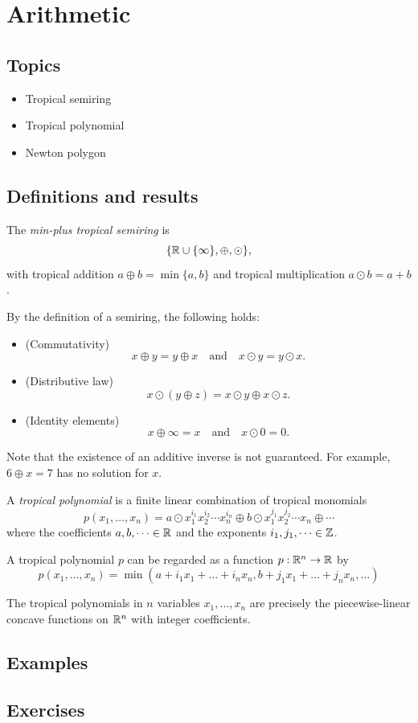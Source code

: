 \documentclass[../../main.tex]{subfiles}
\begin{document}
\section{Arithmetic}

\subsection{Topics}

\begin{itemize}
    \item Tropical semiring
    \item Tropical polynomial
    \item Newton polygon
\end{itemize}

\subsection{Definitions and results}

\begin{defin}
    The \textit{min-plus tropical semiring} is
    \[\{\mathbb{R} \cup \{\infty\},\oplus,\odot\},\]
    with tropical addition $a \oplus b = \min\{a,b\}$ and 
    tropical multiplication $a \odot b = a+b$.
\end{defin}

\begin{rmk}
    By the definition of a semiring, the following holds: 
    \begin{itemize}
        \item (Commutativity)
        \[x\oplus y=y\oplus x \quad \text{and}\quad x\odot y=y\odot x.\]
        \item (Distributive law)
        \[x\odot(y\oplus z)=x\odot y\oplus x\odot z.\]
        \item (Identity elements)
        \[x\oplus \infty=x\quad \text{and}\quad x\odot 0=0.\]
    \end{itemize}

    Note that the existence of an additive inverse is not guaranteed. For example, $6\oplus x=7$ has no solution for $x$.
\end{rmk}

\begin{defin}
    A \textit{tropical polynomial} is a finite linear combination of tropical monomials 
    \[p(x_1,\dots,x_n)=a\odot x_1^{i_1}x_2^{i_2}\cdots x_n^{i_n}\oplus b\odot x_1^{j_1}x_2^{j_2}\cdots x_n\oplus \cdots\]
    where the coefficients $a,b,\dots \in \mathbb{R}$ and the exponents $i_1,j_1,\dots \in \mathbb{Z}$. 

    A tropical polynomial $p$ can be regarded as a function $p:\mathbb{R}^n \to \mathbb{R}$ by
    \[p(x_1,\dots,x_n)=\min(a+i_1x_1+\dots+i_nx_n,b+j_1x_1+\dots+j_nx_n,\dots)\]
\end{defin}

\begin{thm}
    The tropical polynomials in $n$ variables $x_1,\dots,x_n$ are precisely the piecewise-linear concave functions on $\mathbb{R}^n$ with integer coefficients.
\end{thm}



\subsection{Examples}


\subsection{Exercises}
\end{document}
